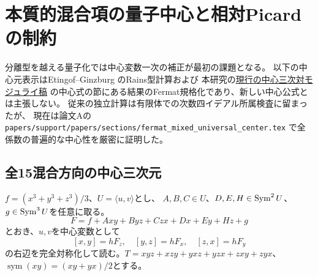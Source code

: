 \section{本質的混合項の量子中心と相対Picardの制約}
\label{sec:mixed-quantum-center}
分離型を越える量子化では中心変数一次の補正が最初の課題となる。
以下の中心元表示はEtingof--Ginzburg \cite[\S9]{EG} のRains型計算および
本研究の\href{https://github.com/uedakazushi/nc-cubic-classification/blob/main/papers/nc_cubic_threefold_moduli.tex}{現行の中心三次対モジュライ稿}
の中心式の節にある結果のFermat規格化であり、新しい中心公式とは主張しない。
従来の独立計算は有限体での次数四イデアル所属検査に留まったが、
現在は論文Aの
\texttt{papers/support/papers/sections/fermat\_mixed\_universal\_center.tex}
で全係数の普遍的な中心性を厳密に証明した。

\subsection{全15混合方向の中心三次元}
$f=(x^3+y^3+z^3)/3$、$U=\langle u,v\rangle$とし、
$A,B,C\in U$、$D,E,H\in\operatorname{Sym}^2U$、$g\in\operatorname{Sym}^3U$を任意に取る。
\begin{equation}\label{eq:full-mixed-fermat}
 F=f+Axy+Byz+Czx+Dx+Ey+Hz+g
\end{equation}
とおき、$u,v$を中心変数として
\begin{equation}\label{eq:full-mixed-brackets}
 [x,y]=hF_z,\quad[y,z]=hF_x,\quad[z,x]=hF_y
\end{equation}
の右辺を完全対称化して読む。$T=xyz+xzy+yxz+yzx+zxy+zyx$、
$\operatorname{sym}(xy)=(xy+yx)/2$とする。


